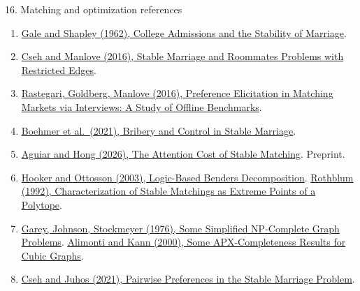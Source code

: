 \begin{frame}[t,label=refs-theory]{16. Matching and optimization references}
\fontsize{9.5}{11.5}\selectfont
\begin{enumerate}
\setlength{\itemsep}{3pt}
\item \href{https://doi.org/10.1080/00029890.1962.11989827}{Gale and Shapley (1962), College Admissions and the Stability of Marriage}.
\item \href{https://doi.org/10.1016/j.disopt.2016.03.002}{Cseh and Manlove (2016), Stable Marriage and Roommates Problems with Restricted Edges}.
\item \href{https://arxiv.org/abs/1602.04792}{Rastegari, Goldberg, Manlove (2016), Preference Elicitation in Matching Markets via Interviews: A Study of Offline Benchmarks}.
\item \href{https://doi.org/10.1613/jair.1.12755}{Boehmer et al.\ (2021), Bribery and Control in Stable Marriage}.
\item \href{https://arxiv.org/abs/2609.09693}{Aguiar and Hong (2026), The Attention Cost of Stable Matching}. Preprint.
\item \href{https://doi.org/10.1007/s10107-003-0375-9}{Hooker and Ottosson (2003), Logic-Based Benders Decomposition}.
\href{https://doi.org/10.1007/BF01586041}{Rothblum (1992), Characterization of Stable Matchings as Extreme Points of a Polytope}.
\item \href{https://doi.org/10.1016/0304-3975(76)90059-1}{Garey, Johnson, Stockmeyer (1976), Some Simplified NP-Complete Graph Problems}.
\href{https://doi.org/10.1016/S0304-3975(98)00158-3}{Alimonti and Kann (2000), Some APX-Completeness Results for Cubic Graphs}.
\item \href{https://hpi.de/friedrich/docs/publications/2021/TEAC.pdf}{Cseh and Juhos (2021), Pairwise Preferences in the Stable Marriage Problem}.
\end{enumerate}
\end{frame}


